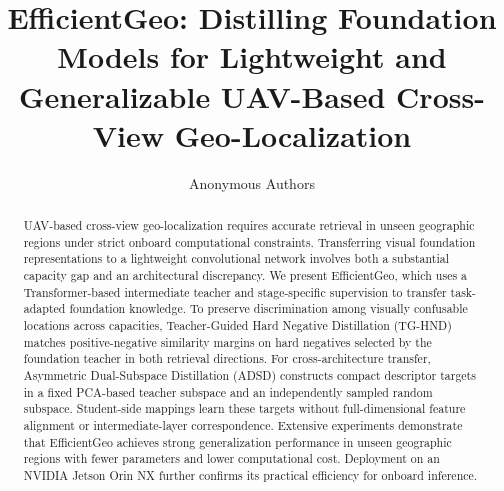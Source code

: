 \documentclass[10pt,twocolumn,letterpaper]{article}
\title{EfficientGeo: Distilling Foundation Models for Lightweight and Generalizable UAV-Based Cross-View Geo-Localization}
\author{Anonymous Authors}
\begin{document}
\maketitle
\begin{abstract}
UAV-based cross-view geo-localization requires accurate retrieval in unseen geographic regions under strict onboard computational constraints. Transferring visual foundation representations to a lightweight convolutional network involves both a substantial capacity gap and an architectural discrepancy. We present EfficientGeo, which uses a Transformer-based intermediate teacher and stage-specific supervision to transfer task-adapted foundation knowledge. To preserve discrimination among visually confusable locations across capacities, Teacher-Guided Hard Negative Distillation (TG-HND) matches positive-negative similarity margins on hard negatives selected by the foundation teacher in both retrieval directions. For cross-architecture transfer, Asymmetric Dual-Subspace Distillation (ADSD) constructs compact descriptor targets in a fixed PCA-based teacher subspace and an independently sampled random subspace. Student-side mappings learn these targets without full-dimensional feature alignment or intermediate-layer correspondence. Extensive experiments demonstrate that EfficientGeo achieves strong generalization performance in unseen geographic regions with fewer parameters and lower computational cost. Deployment on an NVIDIA Jetson Orin NX further confirms its practical efficiency for onboard inference.
\end{abstract}





\clearpage

{\small


}

\end{document}
